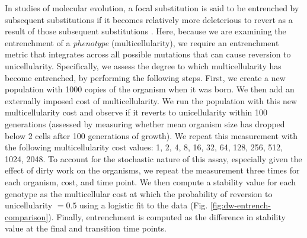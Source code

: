 \documentclass[
]{book}
\begin{document}
In studies of molecular evolution, a focal substitution is said to be entrenched by subsequent substitutions if it becomes relatively more deleterious to revert as a result of those subsequent substitutions \citep{shah2015contingency, flynn2017inference, starr2018pervasive, biswas2019epistasis}. Here, because we are examining the entrenchment of a \textit{phenotype} (multicellularity), we require an entrenchment metric that integrates across all possible mutations that can cause reversion to unicellularity. Specifically, we assess the degree to which multicellularity has become entrenched, by performing the following steps. First, we create a new population with 1000 copies of the organism when it was born. We then add an externally imposed cost of multicellularity. We run the population with this new multicellularity cost and observe if it reverts to unicellularity within 100 generations (assessed by measuring whether mean organism size has dropped below 2 cells after 100 generations of growth). We repeat this measurement with the following multicellularity cost values: 1, 2, 4, 8, 16, 32, 64, 128, 256, 512, 1024, 2048. To account for the stochastic nature of this assay, especially given the effect of dirty work on the organisms, we repeat the measurement three times for each organism, cost, and time point. We then compute a stability value for each genotype as the multicellular cost at which the probability of reversion to unicellularity \(= 0.5\) using a logistic fit to the data (Fig. \ref{fig:dw-entrench-comparison}). Finally, entrenchment is computed as the difference in stability value at the final and transition time points.
\end{document}

